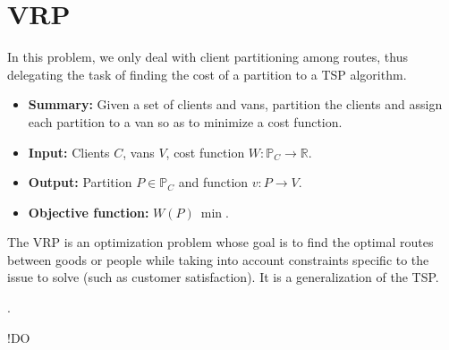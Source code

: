 \section{\texorpdfstring{\Acrlong*{VRP}}{Vehicle routing problem}} \label{algorithm-vrp}
In this problem, we only deal with client partitioning among routes, thus delegating the task of finding the cost of a partition to a \acrshort{TSP} algorithm.\par
\begin{itemize}
    \item \textbf{Summary:} Given a set of clients and vans, partition the clients and assign each partition to a van so as to minimize a cost function.
    \item \textbf{Input:} Clients $C$, vans $V$, cost function $W\colon \mathbb{P}_C \rightarrow \mathbb{R} $.
    \item \textbf{Output:} Partition $P \in \mathbb{P}_C$ and function $v\colon P \rightarrow V$.
    \item \textbf{Objective function:} $W(P)~\min$.
\end{itemize}
The \acrfull*{VRP} is an optimization problem whose goal is to find the optimal routes between goods or people while taking into account constraints specific to the issue to solve (such as customer satisfaction). It is a generalization of the \acrshort{TSP}.




\par.\par

!DO



